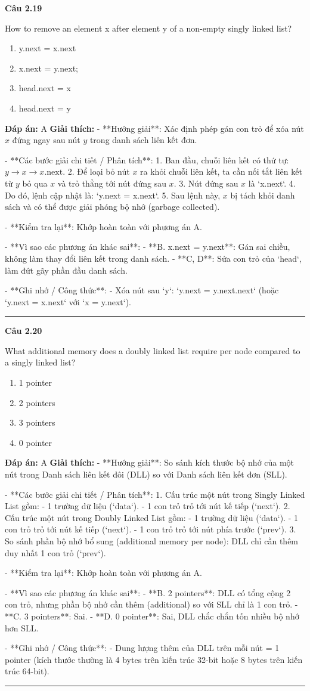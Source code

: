 \documentclass[11pt,a4paper]{article}
\newenvironment{question}[1]{%
  \par\vspace{1em}\noindent\textbf{\large Câu #1}\par\vspace{0.4em}
}{%
  \par\vspace{1em}\hrule\vspace{0.6em}
}
\newenvironment{choices}{%
  \begin{enumerate}[label=\textbf{\Alph*.},leftmargin=2.2em,itemsep=2pt,topsep=3pt]
}{%
  \end{enumerate}
}
\newcommand{\choice}{\item}
\begin{document}
\begin{question}{2.19}
How to remove an element x after element y of a non-empty singly linked list?
\begin{choices}
\choice y.next = x.next
\choice x.next = y.next;
\choice head.next = x
\choice head.next = y
\end{choices}
\textbf{Đáp án:} A
\textbf{Giải thích:} - **Hướng giải**:
  Xác định phép gán con trỏ để xóa nút \(x\) đứng ngay sau nút \(y\) trong danh sách liên kết đơn.

- **Các bước giải chi tiết / Phân tích**:
  1. Ban đầu, chuỗi liên kết có thứ tự: \(y \rightarrow x \rightarrow x.\text{next}\).
  2. Để loại bỏ nút \(x\) ra khỏi chuỗi liên kết, ta cần nối tắt liên kết từ \(y\) bỏ qua \(x\) và trỏ thẳng tới nút đứng sau \(x\).
  3. Nút đứng sau \(x\) là `x.next`.
  4. Do đó, lệnh cập nhật là: `y.next = x.next`.
  5. Sau lệnh này, \(x\) bị tách khỏi danh sách và có thể được giải phóng bộ nhớ (garbage collected).

- **Kiểm tra lại**:
  Khớp hoàn toàn với phương án A.

- **Vì sao các phương án khác sai**:
  - **B. x.next = y.next**: Gán sai chiều, không làm thay đổi liên kết trong danh sách.
  - **C, D**: Sửa con trỏ của `head`, làm đứt gãy phần đầu danh sách.

- **Ghi nhớ / Công thức**:
  - Xóa nút sau `y`: `y.next = y.next.next` (hoặc `y.next = x.next` với `x = y.next`).
\end{question}

\begin{question}{2.20}
What additional memory does a doubly linked list require per node compared to a singly linked list?
\begin{choices}
\choice 1 pointer
\choice 2 pointers
\choice 3 pointers
\choice 0 pointer
\end{choices}
\textbf{Đáp án:} A
\textbf{Giải thích:} - **Hướng giải**:
  So sánh kích thước bộ nhớ của một nút trong Danh sách liên kết đôi (DLL) so với Danh sách liên kết đơn (SLL).

- **Các bước giải chi tiết / Phân tích**:
  1. Cấu trúc một nút trong Singly Linked List gồm:
     - 1 trường dữ liệu (`data`).
     - 1 con trỏ trỏ tới nút kế tiếp (`next`).
  2. Cấu trúc một nút trong Doubly Linked List gồm:
     - 1 trường dữ liệu (`data`).
     - 1 con trỏ trỏ tới nút kế tiếp (`next`).
     - 1 con trỏ trỏ tới nút phía trước (`prev`).
  3. So sánh phần bộ nhớ bổ sung (additional memory per node): DLL chỉ cần thêm duy nhất 1 con trỏ (`prev`).

- **Kiểm tra lại**:
  Khớp hoàn toàn với phương án A.

- **Vì sao các phương án khác sai**:
  - **B. 2 pointers**: DLL có tổng cộng 2 con trỏ, nhưng phần bộ nhớ cần thêm (additional) so với SLL chỉ là 1 con trỏ.
  - **C. 3 pointers**: Sai.
  - **D. 0 pointer**: Sai, DLL chắc chắn tốn nhiều bộ nhớ hơn SLL.

- **Ghi nhớ / Công thức**:
  - Dung lượng thêm của DLL trên mỗi nút = 1 pointer (kích thước thường là 4 bytes trên kiến trúc 32-bit hoặc 8 bytes trên kiến trúc 64-bit).
\end{question}
\end{document}
